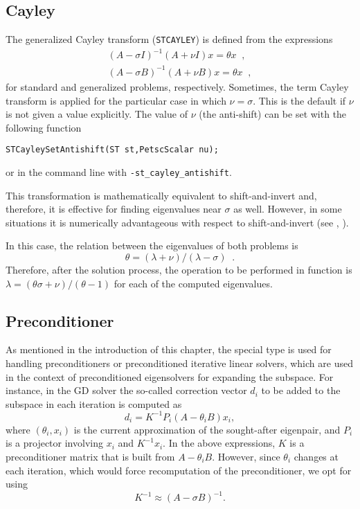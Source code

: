 \subsection{Cayley}
\label{sec:cayley}

	The generalized Cayley transform (\texttt{STCAYLEY}) is defined from the expressions
\begin{eqnarray}
(A-\sigma I)^{-1}(A+\nu I)x=\theta x\;\;,\\
(A-\sigma B)^{-1}(A+\nu B)x=\theta x\;\;,
\end{eqnarray}
for standard and generalized problems, respectively. Sometimes, the term Cayley transform is applied for the particular case in which $\nu=\sigma$. This is the default if $\nu$ is not given a value explicitly. The value of $\nu$ (the anti-shift) can be set with the following function
	\begin{Verbatim}[fontsize=\small]
	STCayleySetAntishift(ST st,PetscScalar nu);
	\end{Verbatim}
or in the command line with \Verb!-st_cayley_antishift!.

This transformation is mathematically equivalent to shift-and-invert and, therefore, it is effective for finding eigenvalues near $\sigma$ as well. However, in some situations it is numerically advantageous with respect to shift-and-invert (see \citep[\S 11.2]{Bai:2000:TSA}, \citep{Lehoucq:2001:LEC}).

In this case, the relation between the eigenvalues of both problems is
\begin{equation}\theta=(\lambda+\nu)/(\lambda-\sigma)\;\;.\end{equation}
Therefore, after the solution process, the operation to be performed in function  is $\lambda=(\theta\sigma+\nu)/(\theta-1)$ for each of the computed eigenvalues.

\subsection{Preconditioner}
\label{sec:precond}

	As mentioned in the introduction of this chapter, the special type  is used for handling preconditioners or preconditioned iterative linear solvers, which are used in the context of preconditioned eigensolvers for expanding the subspace. For instance, in the GD solver the so-called correction vector $d_i$ to be added to the subspace in each iteration is computed as
\begin{equation}
d_i=K^{-1}P_i(A-\theta_i B)x_i,
\end{equation}
where $(\theta_i,x_i)$ is the current approximation of the sought-after eigenpair, and $P_i$ is a projector involving $x_i$ and $K^{-1}x_i$. In the above expressions, $K$ is a preconditioner matrix that is built from $A-\theta_i B$. However, since $\theta_i$ changes at each iteration, which would force recomputation of the preconditioner, we opt for using
\begin{equation}
\label{eq:precon}
K^{-1}\approx (A-\sigma B)^{-1}.
\end{equation}

